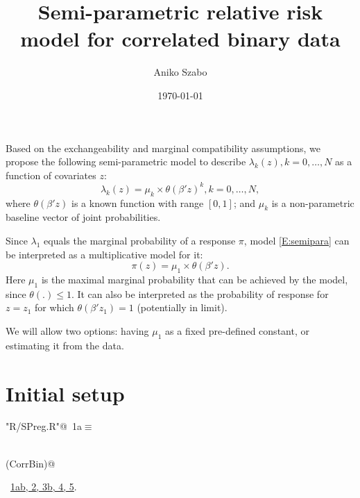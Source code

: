 \documentclass[reqno]{amsart}
\title{Semi-parametric relative risk model for correlated binary data}
\author{Aniko Szabo}
\date{\today}
\renewcommand{\NWtarget}[2]{\hypertarget{#1}{#2}}
\renewcommand{\NWlink}[2]{\hyperlink{#1}{#2}}
\begin{document}
\maketitle

Based on the exchangeability and marginal compatibility assumptions, we propose the following semi-parametric model to describe  $\lambda_k(z), k=0,\ldots, N$ as a function of covariates $z$:
\begin{equation}\label{E:semipara}
	\lambda_k(z) = {\mu_k} \times {\theta(\beta' z)^k}, k = 0, \dots, N,
\end{equation}
where $\theta(\beta' z)$ is a known function with range $[0,1]$; and $\mu_k$ is a non-parametric baseline vector of joint probabilities.

Since $\lambda_1$ equals the marginal probability of a response $\pi$, model \eqref{E:semipara} can be interpreted as a multiplicative model for it:
\begin{equation*}
  \pi(z) = \mu_1 \times \theta(\beta'z).
\end{equation*}
Here $\mu_1$ is the maximal marginal probability that can be achieved by the model, since $\theta(.) \leq 1$. It can also be interpreted as the probability of response for $z=z_1$ for which $\theta(\beta'z_1) = 1$ (potentially in limit).

We will allow two options: having $\mu_1$ as a fixed pre-defined constant, or estimating it from the data.


\section{Initial setup}
\begin{flushleft} \small\label{scrap1}\raggedright\small
\NWtarget{nuweb1a}{} \verb@"R/SPreg.R"@\nobreak\ {\footnotesize {1a}}$\equiv$
\vspace{-1ex}
\begin{list}{}{} \item
\mbox{}\verb@@\\
\mbox{}\verb@require(CorrBin)@\\
\mbox{}\verb@@{\NWsep}
\end{list}
\vspace{-1.5ex}
\footnotesize
\begin{list}{}{\setlength{\itemsep}{-\parsep}\setlength{\itemindent}{-\leftmargin}}
\item \NWtxtFileDefBy\ \NWlink{nuweb1a}{1a}\NWlink{nuweb1b}{b}\NWlink{nuweb2}{, 2}\NWlink{nuweb3b}{, 3b}\NWlink{nuweb4}{, 4}\NWlink{nuweb5}{, 5}.

\item{}
\end{list}
\vspace{4ex}
\end{flushleft}
\end{document}
